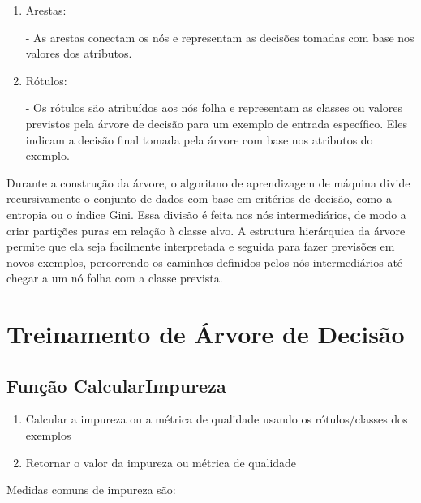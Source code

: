\documentclass[12pt,a4paper, brazil]{article}
\begin{document}
\begin{enumerate}
    \item Arestas:
     
       - As arestas conectam os nós e representam as decisões tomadas com base nos valores dos atributos. 
    
    \item Rótulos:
    
       - Os rótulos são atribuídos aos nós folha e representam as classes ou valores previstos pela árvore de decisão para um exemplo de entrada específico. Eles indicam a decisão final tomada pela árvore com base nos atributos do exemplo.
    
\end{enumerate}

Durante a construção da árvore, o algoritmo de aprendizagem de máquina divide recursivamente o conjunto de dados com base em critérios de decisão, como a entropia ou o índice Gini. Essa divisão é feita nos nós intermediários, de modo a criar partições puras em relação à classe alvo. A estrutura hierárquica da árvore permite que ela seja facilmente interpretada e seguida para fazer previsões em novos exemplos, percorrendo os caminhos definidos pelos nós intermediários até chegar a um nó folha com a classe prevista.

\section{Treinamento de Árvore de Decisão}

\subsection{Função CalcularImpureza}
\begin{enumerate}
  \item Calcular a impureza ou a métrica de qualidade usando os rótulos/classes dos exemplos
  \item Retornar o valor da impureza ou métrica de qualidade
\end{enumerate}

Medidas comuns de impureza são:
\end{document}
